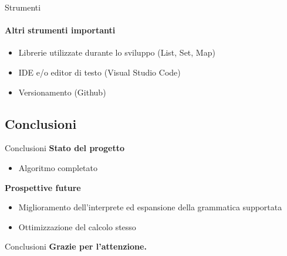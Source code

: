 \documentclass{beamer}
\begin{document}
\begin{darkframes}
    \begin{frame}{Strumenti}
        \framesubtitle{Altri strumenti importanti}
        \begin{itemize}
            \item Librerie utilizzate durante lo sviluppo (List, Set, Map)
            \item IDE e/o editor di testo (Visual Studio Code)
            \item Versionamento (Github)
        \end{itemize}
    \end{frame}

    \subsection{Conclusioni}
    \begin{frame}{Conclusioni}
        \textbf{Stato del progetto}
        \begin{itemize}
            \item Algoritmo completato
        \end{itemize}
        \textbf{Prospettive future}
        \begin{itemize}
            \item Miglioramento dell'interprete ed espansione della grammatica supportata
            \item Ottimizzazione del calcolo stesso
        \end{itemize}
    \end{frame}

    \begin{frame}{Conclusioni}
        \textbf{Grazie per l'attenzione.}
    \end{frame}

\end{darkframes}
\end{document}
